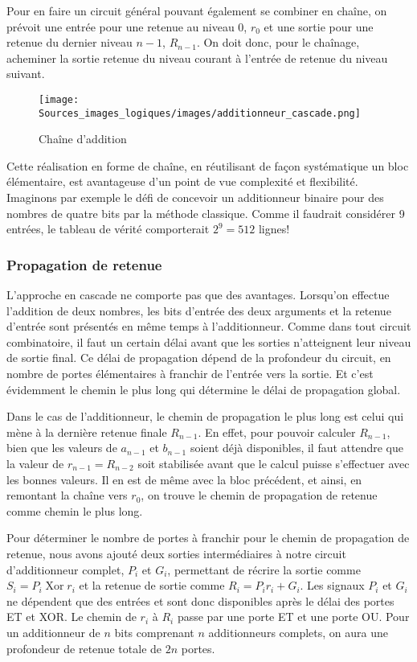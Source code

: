 \documentclass[11pt]{article}
\begin{document}
Pour en faire un circuit général pouvant également se combiner en
chaîne, on prévoit une entrée pour une retenue au niveau 0, \(r_0\) et
une sortie pour une retenue du dernier niveau \(n-1\), \(R_{n-1}\). On
doit donc, pour le chaînage, acheminer la sortie retenue du niveau
courant à l'entrée de retenue du niveau suivant.


\begin{figure}[htbp]
\centering
\texttt{[image: Sources\_images\_logiques/images/additionneur\_cascade.png]}
\caption{\label{fig:org6faa993}Chaîne d'addition}
\end{figure}

Cette réalisation en forme de chaîne, en réutilisant de façon
systématique un bloc élémentaire, est avantageuse d'un point de vue
complexité et flexibilité. Imaginons par exemple le défi de concevoir
un additionneur binaire pour des nombres de quatre bits par la méthode
classique. Comme il faudrait considérer 9 entrées, le tableau de
vérité comporterait \(2^9= 512\) lignes!

\subsubsection{Propagation de retenue}
\label{sec:orgd8c1be6}

L'approche en cascade ne comporte pas que des avantages. Lorsqu'on
effectue l'addition de deux nombres, les bits d'entrée des deux
arguments et la retenue d'entrée sont présentés en même temps à
l'additionneur.  Comme dans tout circuit combinatoire, il faut un
certain délai avant que les sorties n'atteignent leur niveau de sortie
final.  Ce délai de propagation dépend de la profondeur du circuit, en
nombre de portes élémentaires à franchir de l'entrée vers la
sortie.  Et c'est évidemment le chemin le plus long qui détermine le
délai de propagation global.  

Dans le cas de l'additionneur, le chemin de propagation le plus long
est celui qui mène à la dernière retenue finale \(R_{n-1}\).  En
effet, pour pouvoir calculer \(R_{n-1}\), bien que les valeurs de
\(a_{n-1}\) et \(b_{n-1}\) soient déjà disponibles, il faut attendre
que la valeur de \(r_{n-1} = R_{n-2}\) soit stabilisée avant que le
calcul puisse s'effectuer avec les bonnes valeurs. Il en est de même
avec la bloc précédent, et ainsi, en remontant la chaîne vers \(r_0\),
on trouve le chemin de propagation de retenue comme chemin le plus
long.

Pour déterminer le nombre de portes à franchir pour le chemin de
propagation de retenue, nous avons ajouté deux sorties intermédiaires
à notre circuit d'additionneur complet, \(P_i\) et \(G_i\), permettant
de récrire la sortie comme \(S_i = P_i  \operatorname{Xor} r_i\) et la retenue de
sortie comme \(R_i = P_i r_i + G_i\). Les signaux \(P_i\) et \(G_i\)
ne dépendent que des entrées et sont donc disponibles après le délai
des portes ET et XOR. Le chemin de \(r_i\) à \(R_i\) passe par une
porte ET et une porte OU. Pour un additionneur de \(n\) bits
comprenant \(n\) additionneurs complets, on aura une profondeur de
retenue totale de \(2n\) portes.
\end{document}
